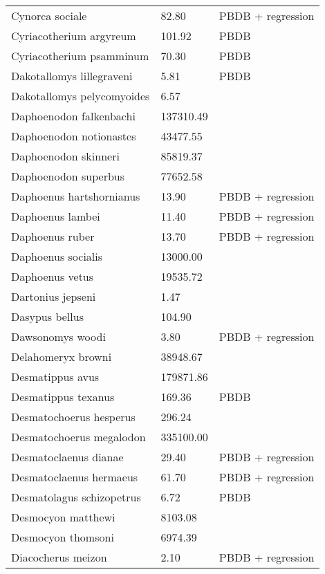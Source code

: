 \begin{longtable}{p{} p{} p{}}
    Cynorca sociale & 82.80 & PBDB + regression \\ 
    Cyriacotherium argyreum & 101.92 & PBDB \\ 
    Cyriacotherium psamminum & 70.30 & PBDB \\ 
    Dakotallomys lillegraveni & 5.81 & PBDB \\ 
    Dakotallomys pelycomyoides & 6.57 & \cite{Mihlbacher2006} \\ 
    Daphoenodon falkenbachi & 137310.49 & \cite{Tomiya2013} \\ 
    Daphoenodon notionastes & 43477.55 & \cite{Tomiya2013} \\ 
    Daphoenodon skinneri & 85819.37 & \cite{Tomiya2013} \\ 
    Daphoenodon superbus & 77652.58 & \cite{Tomiya2013} \\ 
    Daphoenus hartshornianus & 13.90 & PBDB + regression \\ 
    Daphoenus lambei & 11.40 & PBDB + regression \\ 
    Daphoenus ruber & 13.70 & PBDB + regression \\ 
    Daphoenus socialis & 13000.00 & \cite{McKenna2011} \\ 
    Daphoenus vetus & 19535.72 & \cite{Tomiya2013} \\ 
    Dartonius jepseni & 1.47 & \cite{Hay1969} \\ 
    Dasypus bellus & 104.90 & \cite{Smith2004} \\ 
    Dawsonomys woodi & 3.80 & PBDB + regression \\ 
    Delahomeryx browni & 38948.67 & \cite{Tomiya2013} \\ 
    Desmatippus avus & 179871.86 & \cite{Tomiya2013} \\ 
    Desmatippus texanus & 169.36 & PBDB \\ 
    Desmatochoerus hesperus & 296.24 & \cite{McGrew1939} \\ 
    Desmatochoerus megalodon & 335100.00 & \cite{McKenna2011} \\ 
    Desmatoclaenus dianae & 29.40 & PBDB + regression \\ 
    Desmatoclaenus hermaeus & 61.70 & PBDB + regression \\ 
    Desmatolagus schizopetrus & 6.72 & PBDB \\ 
    Desmocyon matthewi & 8103.08 & \cite{Tomiya2013} \\ 
    Desmocyon thomsoni & 6974.39 & \cite{Tomiya2013} \\ 
    Diacocherus meizon & 2.10 & PBDB + regression \\ 

\end{longtable}
